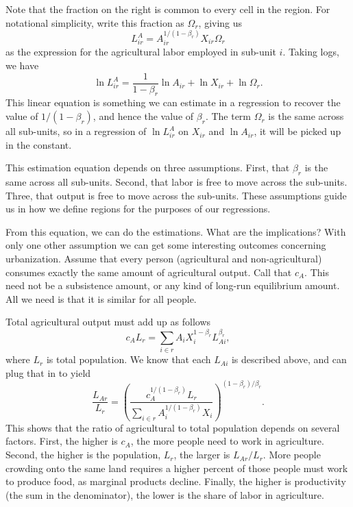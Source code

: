 \documentclass[10pt]{article}
\begin{document}
Note that the fraction on the right is common to every cell in the region. For notational simplicity, write this fraction as $\Omega_r$, giving us
\begin{equation}
L^A_{ir} = A_{ir}^{1/(1-\beta_r)}X_{ir} \Omega_r
\end{equation}
as the expression for the agricultural labor employed in sub-unit $i$. Taking logs, we have
\begin{equation}
\ln L^A_{ir} = \frac{1}{1-\beta_r} \ln A_{ir} + \ln X_{ir} + \ln \Omega_r. \label{eq_est}
\end{equation}
This linear equation is something we can estimate in a regression to recover the value of $1/(1-\beta_r)$, and hence the value of $\beta_r$. The term $\Omega_r$ is the same across all sub-units, so in a regression of $\ln L^A_{ir}$ on $X_{ir}$ and $\ln A_{ir}$, it will be picked up in the constant.

This estimation equation depends on three assumptions. First, that $\beta_r$ is the same across all sub-units. Second, that labor is free to move across the sub-units. Three, that output is free to move across the sub-units. These assumptions guide us in how we define regions for the purposes of our regressions. 




From this equation, we can do the estimations. What are the implications? With only one other assumption we can get some interesting outcomes concerning urbanization. Assume that every person (agricultural and non-agricultural) consumes exactly the same amount of agricultural output. Call that $c_A$. This need not be a subsistence amount, or any kind of long-run equilibrium amount. All we need is that it is similar for all people. 

Total agricultural output must add up as follows
\begin{equation}
c_A L_r = \sum_{i \in r} A_i X_i^{1-\beta_r} L_{Ai}^{\beta_r},
\end{equation}
where $L_r$ is total population. We know that each $L_{Ai}$ is described above, and can plug that in to yield
\begin{equation}
\frac{L_{Ar}}{L_r} = \left(\frac{c_A^{1/(1-\beta_r)} L_r}{\sum_{i \in r} A_i^{1/(1-\beta_r)} X_i}\right)^{(1-\beta_r)/\beta_r}.
\end{equation}
This shows that the ratio of agricultural to total population depends on several factors. First, the higher is $c_A$, the more people need to work in agriculture. Second, the higher is the population, $L_r$, the larger is $L_{Ar}/L_r$. More people crowding onto the same land requires a higher percent of those people must work to produce food, as marginal products decline. Finally, the higher is productivity (the sum in the denominator), the lower is the share of labor in agriculture.
\end{document}
